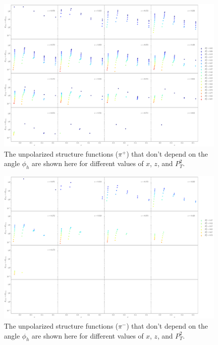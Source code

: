 \begin{figure}
	\centering 
	\includegraphics[width = \textwidth]{image/plots/sidis/pip_f0_superimpose_pt2.pdf}
	\caption{The unpolarized structure functions ($\pi^+$) that don't depend on the angle $\phi_h$ are shown here for different values of $x$, $z$, and $P_T^2$.}
	\label{fig:pipf0x}	
\end{figure}

\begin{figure}
	\centering 
	\includegraphics[width = \textwidth]{image/plots/sidis/pim_f0_superimpose_pt2.pdf}
	\caption{The unpolarized structure functions ($\pi^-$) that don't depend on the angle $\phi_h$ are shown here for different values of $x$, $z$, and $P_T^2$.}
	\label{fig:pipf0x}	
\end{figure}
